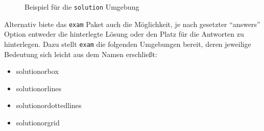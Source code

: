 \begin{figure}
\caption{Beispiel für die \texttt{solution} Umgebung}\label{fig:sol2}
\end{figure}

Alternativ biete das \texttt{exam} Paket auch die Möglichkeit, je nach gesetzter \enquote{answers} Option entweder die hinterlegte Lösung oder den Platz für die Antworten zu hinterlegen. 
Dazu stellt \texttt{exam} die folgenden Umgebungen bereit, deren jeweilige Bedeutung sich leicht aus dem Namen erschließt:

\begin{itemize}
	\item solutionorbox
	\item solutionorlines
	\item solutionordottedlines
	\item solutionorgrid
\end{itemize}

